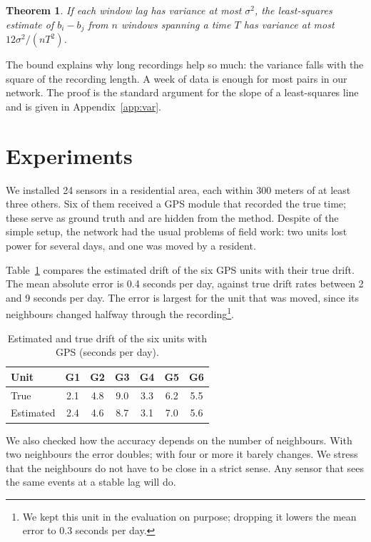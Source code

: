 \documentclass{article}
\newtheorem{thm}{Theorem}
\begin{document}
\begin{thm}\label{thm:var}
  If each window lag has variance at most $\sigma^2$, the least-squares estimate of $b_i - b_j$ from
  $n$ windows spanning a time $T$ has variance at most $12 \sigma^2 / (n T^2)$.
\end{thm}

The bound explains why long recordings help so much: the variance falls with
the square of the recording length. A week of data is enough for most pairs
in our network. The proof is the standard argument for the slope of a
least-squares line and is given in Appendix~\ref{app:var}.

\section{Experiments}

We installed 24 sensors in a residential area, each within 300 meters of at
least three others. Six of them received a GPS module that recorded the true
time; these serve as ground truth and are hidden from the method. Despite of
the simple setup, the network had the usual problems of field work: two
units lost power for several days, and one was moved by a resident.

Table~\ref{tab:drift} compares the estimated drift of the six GPS units with
their true drift. The mean absolute error is 0.4 seconds per day, against
true drift rates between 2 and 9 seconds per day. The error is largest for
the unit that was moved, since its neighbours changed halfway through the
recording\footnote{We kept this unit in the evaluation on purpose; dropping
it lowers the mean error to 0.3 seconds per day.}.

\begin{table}[t]
  \centering
  \caption{Estimated and true drift of the six units with GPS (seconds per day).}
  \label{tab:drift}
  \begin{tabular}{lcccccc}
    \toprule
    Unit & G1 & G2 & G3 & G4 & G5 & G6 \\
    \midrule
    True & 2.1 & 4.8 & 9.0 & 3.3 & 6.2 & 5.5 \\
    Estimated & 2.4 & 4.6 & 8.7 & 3.1 & 7.0 & 5.6 \\
    \bottomrule
  \end{tabular}
\end{table}

We also checked how the accuracy depends on the number of neighbours. With
two neighbours the error doubles; with four or more it barely changes. We
stress that the neighbours do not have to be close in a strict sense. Any
sensor that sees the same events at a stable lag will do.
\end{document}
